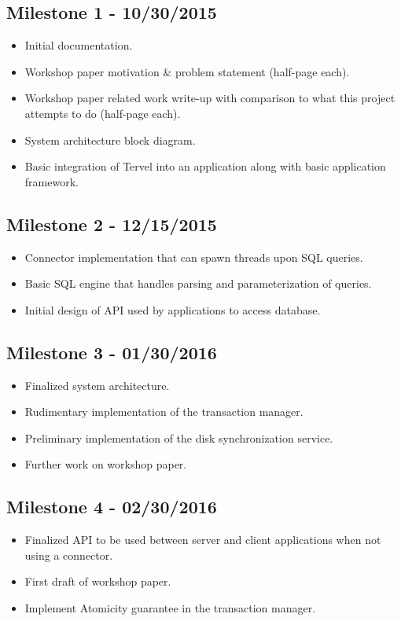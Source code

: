 \documentclass[letterpaper]{article}
\begin{document}
  \subsection{Milestone 1 - 10/30/2015}
  \begin{itemize}
   \item Initial documentation.
   \item Workshop paper motivation \& problem statement (half-page each).
   \item Workshop paper related work write-up with comparison to what this project attempts to do (half-page each).
   \item System architecture block diagram.
   \item Basic integration of Tervel into an application along with basic application framework.
  \end{itemize}
  \subsection{Milestone 2 - 12/15/2015}
  \begin{itemize}
   \item Connector implementation that can spawn threads upon SQL queries.
   \item Basic SQL engine that handles parsing and parameterization of queries.
   \item Initial design of API used by applications to access database.
  \end{itemize}
  \subsection{Milestone 3 - 01/30/2016}
  \begin{itemize}
   \item Finalized system architecture.
   \item Rudimentary implementation of the transaction manager.
   \item Preliminary implementation of the disk synchronization service.
   \item Further work on workshop paper.
  \end{itemize}
  \subsection{Milestone 4 - 02/30/2016}
  \begin{itemize}
   \item Finalized API to be used between server and client applications when not using a connector.
   \item First draft of workshop paper.
   \item Implement Atomicity guarantee in the transaction manager.
  \end{itemize}
\end{document}
